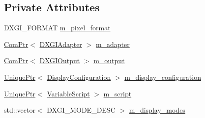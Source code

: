 \subsection*{Private Attributes}
\begin{DoxyCompactItemize}
\item 
D\+X\+G\+I\+\_\+\+F\+O\+R\+M\+AT \mbox{\hyperlink{classmage_1_1rendering_1_1_display_configurator_1_1_impl_a87d52e7bc1a1e4fe9786b3b0ec3fc1e1}{m\+\_\+pixel\+\_\+format}}
\item 
\mbox{\hyperlink{namespacemage_ae74f374780900893caa5555d1031fd79}{Com\+Ptr}}$<$ \mbox{\hyperlink{namespacemage_1_1rendering_ad55e028ebd705b547eeb972ad8d03b6a}{D\+X\+G\+I\+Adapter}} $>$ \mbox{\hyperlink{classmage_1_1rendering_1_1_display_configurator_1_1_impl_a49b407f044b7e34f9b58dbd86648bb46}{m\+\_\+adapter}}
\item 
\mbox{\hyperlink{namespacemage_ae74f374780900893caa5555d1031fd79}{Com\+Ptr}}$<$ \mbox{\hyperlink{namespacemage_1_1rendering_aaf22d3893277a4bd8497f6ea69b01532}{D\+X\+G\+I\+Output}} $>$ \mbox{\hyperlink{classmage_1_1rendering_1_1_display_configurator_1_1_impl_accf774307783109a1e885efc5ec19a90}{m\+\_\+output}}
\item 
\mbox{\hyperlink{namespacemage_a3316d7143a973e37adf1110f2e80ca31}{Unique\+Ptr}}$<$ \mbox{\hyperlink{classmage_1_1rendering_1_1_display_configuration}{Display\+Configuration}} $>$ \mbox{\hyperlink{classmage_1_1rendering_1_1_display_configurator_1_1_impl_a445c59ccde512df51bb77b9aaa2ecb23}{m\+\_\+display\+\_\+configuration}}
\item 
\mbox{\hyperlink{namespacemage_a3316d7143a973e37adf1110f2e80ca31}{Unique\+Ptr}}$<$ \mbox{\hyperlink{classmage_1_1_variable_script}{Variable\+Script}} $>$ \mbox{\hyperlink{classmage_1_1rendering_1_1_display_configurator_1_1_impl_aa11b99f1bdf03e3d1eee4d4907479c45}{m\+\_\+script}}
\item 
std\+::vector$<$ D\+X\+G\+I\+\_\+\+M\+O\+D\+E\+\_\+\+D\+E\+SC $>$ \mbox{\hyperlink{classmage_1_1rendering_1_1_display_configurator_1_1_impl_ae04d4e1430c684cb0961f838d040f6e1}{m\+\_\+display\+\_\+modes}}
\end{DoxyCompactItemize}
